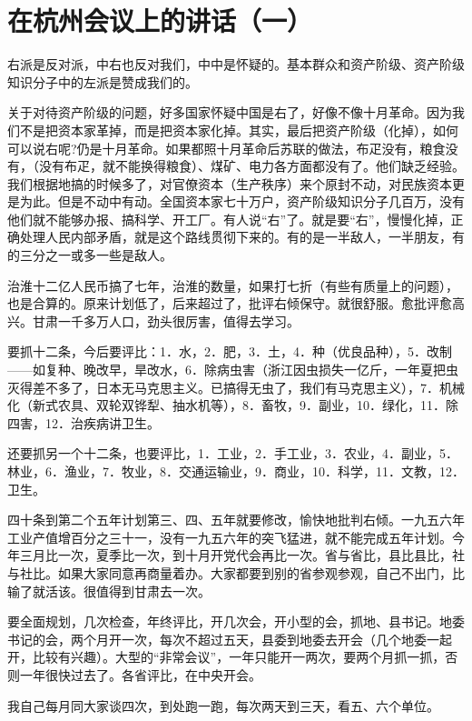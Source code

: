 \section[在杭州会议上的讲话（一）（一九五八年一月三日）]{在杭州会议上的讲话（一）}


右派是反对派，中右也反对我们，中中是怀疑的。基本群众和资产阶级、资产阶级知识分子中的左派是赞成我们的。

关于对待资产阶级的问题，好多国家怀疑中国是右了，好像不像十月革命。因为我们不是把资本家革掉，而是把资本家化掉。其实，最后把资产阶级（化掉），如何可以说右呢?仍是十月革命。如果都照十月革命后苏联的做法，布疋没有，粮食没有，（没有布疋，就不能换得粮食）、煤矿、电力各方面都没有了。他们缺乏经验。我们根据地搞的时候多了，对官僚资本（生产秩序）来个原封不动，对民族资本更是为此。但是不动中有动。全国资本家七十万户，资产阶级知识分子几百万，没有他们就不能够办报、搞科学、开工厂。有人说“右”了。就是要“右”，慢慢化掉，正确处理人民内部矛盾，就是这个路线贯彻下来的。有的是一半敌人，一半朋友，有的三分之一或多一些是敌人。

治淮十二亿人民币搞了七年，治淮的数量，如果打七折（有些有质量上的问题），也是合算的。原来计划低了，后来超过了，批评右倾保守。就很舒服。愈批评愈高兴。甘肃一千多万人口，劲头很厉害，值得去学习。

要抓十二条，今后要评比：1．水，2．肥，3．土，4．种（优良品种），5．改制——如复种、晚改早，旱改水，6．除病虫害（浙江因虫损失一亿斤，一年夏把虫灭得差不多了，日本无马克思主义。已搞得无虫了，我们有马克思主义），7．机械化（新式农具、双轮双铧犁、抽水机等），8．畜牧，9．副业，10．绿化，11．除四害，12．治疾病讲卫生。

还要抓另一个十二条，也要评比，1．工业，2．手工业，3．农业，4．副业，5．林业，6．渔业，7．牧业，8．交通运输业，9．商业，10．科学，11．文教，12．卫生。

四十条到第二个五年计划第三、四、五年就要修改，愉快地批判右倾。一九五六年工业产值增百分之三十一，没有一九五六年的突飞猛进，就不能完成五年计划。今年三月比一次，夏季比一次，到十月开党代会再比一次。省与省比，县比县比，社与社比。如果大家同意再商量着办。大家都要到别的省参观参观，自己不出门，比输了就活该。很值得到甘肃去一次。

要全面规划，几次检查，年终评比，开几次会，开小型的会，抓地、县书记。地委书记的会，两个月开一次，每次不超过五天，县委到地委去开会（几个地委一起开，比较有兴趣）。大型的“非常会议”，一年只能开一两次，要两个月抓一抓，否则一年很快过去了。各省评比，在中央开会。

我自己每月同大家谈四次，到处跑一跑，每次两天到三天，看五、六个单位。

